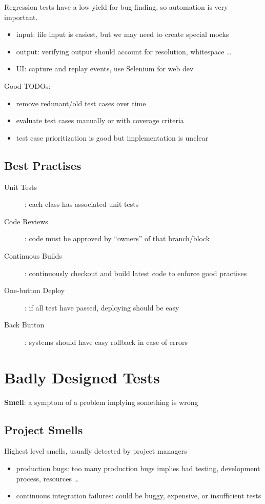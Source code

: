 \documentclass[]{article}
\theoremstyle{definition}
\begin{document}
	Regression tests have a low yield for bug-finding, so automation is very important.
	\begin{itemize}
		\item input: file input is easiest, but we may need to create special mocks
		\item output: verifying output should account for resolution, whitespace \dots
		\item UI: capture and replay events, use Selenium for web dev
	\end{itemize}

	Good TODOs:
	\begin{itemize}
		\item remove redunant/old test cases over time
		\item evaluate test cases manually or with coverage criteria
		\item test case prioritization is good but implementation is unclear
	\end{itemize}

	\subsection{Best Practises}
	\begin{description}
		\item[Unit Tests]: each class has associated unit tests
		\item[Code Reviews]: code must be approved by ``owners'' of that branch/block
		\item[Continuous Builds]: continuously checkout and build latest code to enforce good practises
		\item[One-button Deploy]: if all test have passed, deploying should be easy
		\item[Back Button]: systems should have easy rollback in case of errors
	\end{description}

	\section{Badly Designed Tests}
	\textbf{Smell}: a symptom of a problem implying something is wrong

	\subsection{Project Smells}
	Highest level smells, usually detected by project managers
	\begin{itemize}
		\item production bugs: too many production bugs implies bad testing, development process, resources \dots
		\item continuous integration failures: could be buggy, expensive, or insufficient tests
	\end{itemize}
\end{document}

